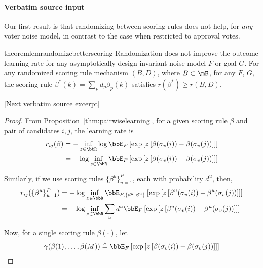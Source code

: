 \documentclass[10pt]{article}
\begin{document}
\paragraph{Verbatim source input}
\begin{ReviewVerbatim}
Our first result is that randomizing between scoring rules does not help, for \textit{any} voter noise model, in contrast to the case when restricted to approval votes.


\begin{restatable}{theorem}{lemrandomizebetterscoring}
	\label{lem:randomizebetterscoring}
	Randomization does not improve the outcome learning rate for any asymptotically design-invariant noise model $F$ or goal $G$.  For any randomized scoring rule mechanism $(B,D)$, where $B\subset \mB$, for any $F$, $G$, the scoring rule $\beta^*(k) = \sum_{p} d_p \beta_p(k)$ satisfies $r(\beta^*) \geq r(B,D)$.


%
%
\end{restatable}

[Next verbatim source excerpt]

\lemrandomizebetterscoring*
\begin{proof}
	From Proposition~\ref{thm:pairwiselearning}, for a given scoring rule $\beta$ and pair of candidates $i,j$, the learning rate is
	\begin{align*}
	r_{ij}(\beta) &= -\inf_{z\in\bbR} \log \bbE_F\left[\exp\left[z\left[\beta(\sigma_v(i)) - \beta(\sigma_v(j))\right]\right]\right]\\
	&= - \log \inf_{z\in\bbR} \bbE_F\left[\exp\left[z\left[\beta(\sigma_v(i)) - \beta(\sigma_v(j))\right]\right]\right]
	\end{align*}

	Similarly, if we use scoring rules $\{\beta^u\}_{u=1}^P$, each with probability $d^u$, then,
	\begin{align*}
	r_{ij}(\{\beta^u\}_{u=1}^P) &= - \log \inf_{z\in\bbR} \bbE_{F,\{d^u,\beta^u\}}\left[\exp\left[z\left[\beta^u(\sigma_v(i)) - \beta^u(\sigma_v(j))\right]\right]\right]\\
	&= - \log \inf_{z\in\bbR} \sum_u d^u  \bbE_{F}\left[\exp\left[z\left[\beta^u(\sigma_v(i)) - \beta^u(\sigma_v(j))\right]\right]\right]
	\end{align*}


	Now, for a single scoring rule $\beta(\cdot)$, let \[\gamma(\beta(1) , \dots, \beta(M)) \triangleq  \bbE_F\left[\exp\left[z\left[\beta(\sigma_v(i)) - \beta(\sigma_v(j))\right]\right]\right]\]



\end{proof}
\end{ReviewVerbatim}
\end{document}
